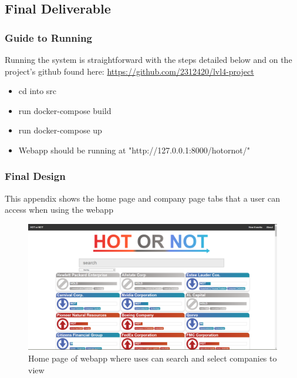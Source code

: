\documentclass{l4proj}
\begin{document}
\begin{appendices}
\chapter{Final Deliverable}
\label{Ap: Final Deliverable}

\subsection{Guide to Running}
Running the system is straightforward with the steps detailed below and on the project's github found here: \url{https://github.com/2312420/lvl4-project}

\begin{itemize}
    \item cd into src
    \item run docker-compose build
    \item run docker-compose up
    \item Webapp should be running at "http://127.0.0.1:8000/hotornot/"
\end{itemize}

\subsection{Final Design}
This appendix shows the home page and company page tabs that a user can access when using the webapp

\begin{figure}[h]
    \centering
    \includegraphics[width=\linewidth]{images/upload/a_homepage.PNG}
    \caption{Home page of webapp where uses can search and select companies to view }
    \label{fig:a_homepage}
\end{figure}

\bigskip


\end{appendices}
\end{document}

